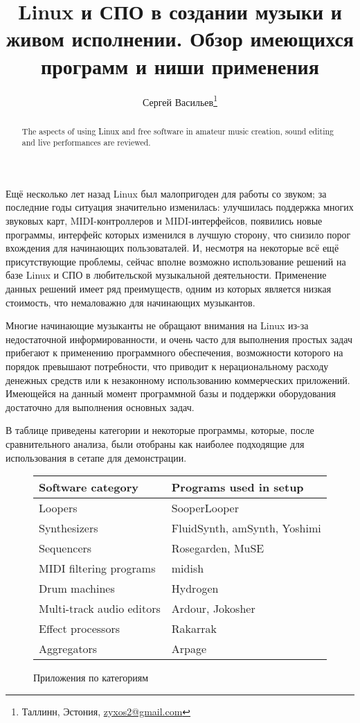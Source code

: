 \documentclass[10pt, a5paper]{article}
\begin{document}
\title{Linux и СПО в создании музыки и живом исполнении. Обзор имеющихся программ и ниши применения}
\author{Сергей Васильев\footnote{Таллинн, Эстония, \url{zyxos2@gmail.com}}}
\date{}
\maketitle
\begin{abstract}
The aspects of using Linux and free software in amateur music creation, sound editing and live performances are reviewed.
\end{abstract}

Ещё несколько лет назад Linux был малопригоден для работы со звуком; за последние годы ситуация значительно изменилась: улучшилась поддержка многих звуковых карт, MIDI-контроллеров и MIDI-интерфейсов, появились новые программы, интерфейс которых изменился в лучшую сторону, что снизило порог вхождения для начинающих пользоваталей. И, несмотря на некоторые всё ещё присутствующие проблемы, сейчас вполне возможно использование решений на базе Linux и СПО в любительской музыкальной деятельности. Применение данных решений имеет ряд преимуществ, одним из которых является низкая стоимость, что немаловажно для начинающих музыкантов. 

Многие начинающие музыканты не обращают внимания на Linux из-за недостаточной информированности, и очень часто для выполнения простых задач прибегают к применению программного обеспечения, возможности которого на порядок превышают потребности, что приводит к нерациональному расходу денежных средств или к незаконному использованию коммерческих приложений. Имеющейся на данный момент программной базы и поддержки оборудования достаточно для выполнения основных задач. 

В таблице приведены категории и некоторые программы, которые, после сравнительного анализа, были отобраны как наиболее подходящие для использования в сетапе для демонстрации.

\begin{figure}[ht]
\centering
\begin{tabular}{|l|l|}
\hline
Software category & Programs used in setup \\
\hline
Loopers & SooperLooper \\
Synthesizers & FluidSynth, amSynth, Yoshimi \\
Sequencers & Rosegarden, MuSE \\
MIDI filtering programs & midish \\
Drum machines & Hydrogen \\
Multi-track audio editors & Ardour, Jokosher \\
Effect processors & Rakarrak \\
Aggregators & Arpage \\
\hline
\end{tabular}
\caption{Приложения по категориям}
\end{figure}
\end{document}
